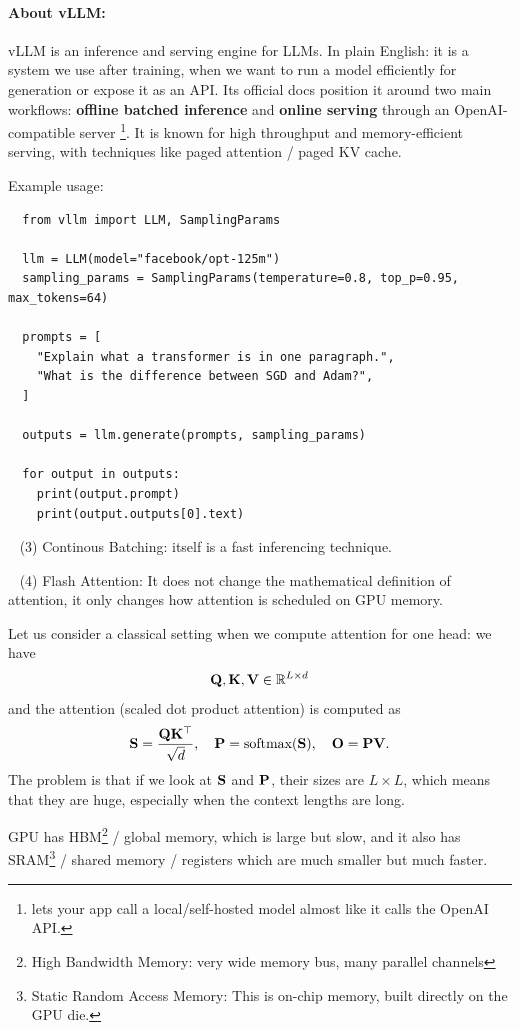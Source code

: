 \documentclass[11pt]{article}  %
\begin{document}
\paragraph{About vLLM:}
vLLM is an inference and serving engine for LLMs. 
In plain English: it is a system we use after training, when we want to run a model efficiently for generation or expose it as an API. 
Its official docs position it around two main workflows: \textbf{offline batched inference} and \textbf{online serving} through an OpenAI-compatible server \footnote{lets your app call a local/self-hosted model almost like it calls the OpenAI API.}. 
It is known for high throughput and memory-efficient serving, with techniques like paged attention / paged KV cache.

Example usage:
\begin{lstlisting}
  from vllm import LLM, SamplingParams

  llm = LLM(model="facebook/opt-125m")
  sampling_params = SamplingParams(temperature=0.8, top_p=0.95, max_tokens=64)

  prompts = [
    "Explain what a transformer is in one paragraph.",
    "What is the difference between SGD and Adam?",
  ]

  outputs = llm.generate(prompts, sampling_params)

  for output in outputs:
    print(output.prompt)
    print(output.outputs[0].text)
\end{lstlisting}

\textbullet~ (3) Continous Batching: itself is a fast inferencing technique.

\textbullet~ (4) Flash Attention: It does not change the mathematical definition of attention, it only changes how attention is scheduled on GPU memory.

Let us consider a classical setting when we compute attention for one head: we have 
\begin{align*}
  \mathbf{Q}, \mathbf{K}, \mathbf{V} \in \mathbb{R}^{L \times d}
\end{align*}
and the attention (scaled dot product attention) is computed as 
\begin{align*}
  \mathbf{S} = \frac{\mathbf{Q}\mathbf{K}^{\top}}{\sqrt{d}}, \quad \mathbf{P} = \text{softmax}(\mathbf{S}), \quad \mathbf{O} = \mathbf{P}\mathbf{V}.
\end{align*}
The problem is that if we look at $\mathbf{S}$ and $\mathbf{P}$, their sizes are $L \times L$, which means that they are huge, especially when the context lengths are long.

GPU has HBM\footnote{High Bandwidth Memory: very wide memory bus, many parallel channels} / global memory, which is large but slow, and it also has SRAM\footnote{Static Random Access Memory: This is on-chip memory, built directly on the GPU die.} / shared memory / registers which are much smaller but much faster.
\end{document}
